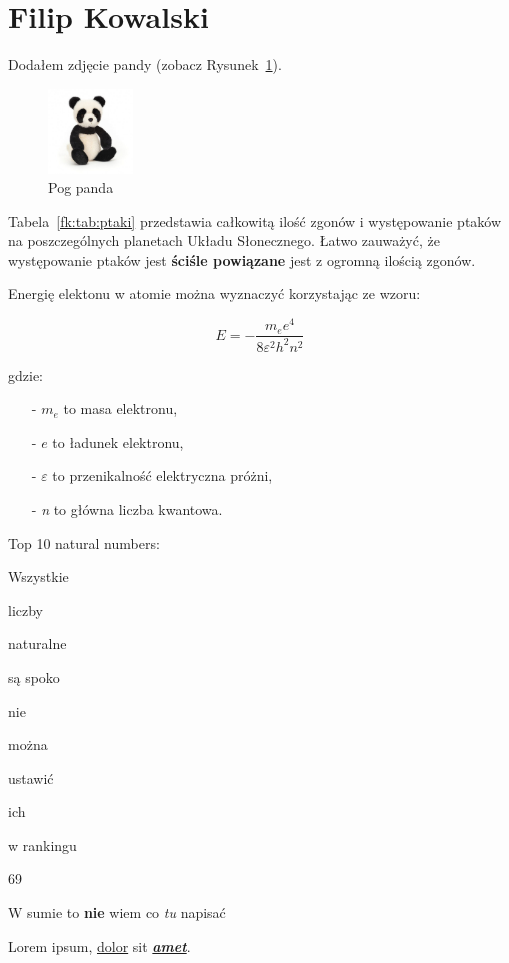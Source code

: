 \section{Filip Kowalski}
\label{sec:fk}

Dodałem zdjęcie pandy (zobacz Rysunek~\ref{fk:fig:plush_panda}).

\begin{figure}[htbp]
    \centering
    \includegraphics[width=0.2\textwidth]{pictures/plush_panda.jpg} %
    \caption{Pog panda}
    \label{fk:fig:plush_panda}
\end{figure}

Tabela~\ref{fk:tab:ptaki} przedstawia całkowitą ilość zgonów i występowanie ptaków na poszczególnych planetach Układu Słonecznego. Łatwo zauważyć, że występowanie ptaków jest \textbf{ściśle powiązane} jest z ogromną ilością zgonów.



Energię elektonu w atomie można wyznaczyć korzystając ze wzoru:

$$ E = -\frac{m_e e^4}{8\varepsilon^2h^2n^2}$$

gdzie:

\begin{itemize}
  \item[-] $m_e$ to masa elektronu,
  \item[-] $e$ to ładunek elektronu,
  \item[-] $\varepsilon$ to przenikalność elektryczna próżni,
  \item[-] {\it n} to główna liczba kwantowa.
\end{itemize}

\newpage

\begin{flushleft}
Top 10 natural numbers:
\begin{etaremune}
  \item Wszystkie
  \item liczby
  \item naturalne
  \item są spoko
  \item nie
  \item można
  \item ustawić
  \item ich
  \item w rankingu
  \item 69
\end{etaremune}
\end{flushleft}

\vspace{2em}

\begin{center}
    W sumie to \textbf{nie} wiem co \textit{tu} napisać \par
    Lorem ipsum, \underline{dolor} sit \textbf{\textit{\underline{amet}}}.
\end{center}
